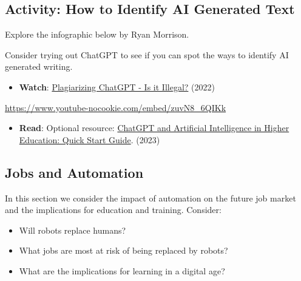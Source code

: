 \documentclass[
  letterpaper,
  DIV=11,
  numbers=noendperiod]{scrreprt}
\providecommand{\tightlist}{%
  \setlength{\itemsep}{0pt}\setlength{\parskip}{0pt}}\usepackage{longtable,booktabs,array}
\begin{document}
\subsection{Activity: How to Identify AI Generated
Text}\label{activity-how-to-identify-ai-generated-text}

\begin{tcolorbox}[enhanced jigsaw, toprule=.15mm, colback=white, colframe=quarto-callout-note-color-frame, bottomtitle=1mm, leftrule=.75mm, coltitle=black, titlerule=0mm, rightrule=.15mm, colbacktitle=quarto-callout-note-color!10!white, left=2mm, title={Learning Activity}, opacitybacktitle=0.6, opacityback=0, breakable, toptitle=1mm, arc=.35mm, bottomrule=.15mm]

Explore the infographic below by Ryan Morrison.

Consider trying out ChatGPT to see if you can spot the ways to identify
AI generated writing.

\begin{itemize}
\tightlist
\item
  \textbf{Watch}:
  \href{https://www.youtube.com/watch?v=zuvN8_6QIKk}{Plagiarizing
  ChatGPT - Is it Illegal?} (2022)
\end{itemize}

\url{https://www.youtube-nocookie.com/embed/zuvN8_6QIKk}

\begin{itemize}
\tightlist
\item
  \textbf{Read}: Optional resource:
  \href{https://www.iesalc.unesco.org/wp-content/uploads/2023/04/ChatGPT-and-Artificial-Intelligence-in-higher-education-Quick-Start-guide_EN_FINAL.pdf}{ChatGPT
  and Artificial Intelligence in Higher Education: Quick Start Guide}.
  (2023)
\end{itemize}

\end{tcolorbox}

\subsection*{Jobs and Automation}\label{jobs-and-automation}

In this section we consider the impact of automation on the future job
market and the implications for education and training. Consider:

\begin{itemize}
\tightlist
\item
  Will robots replace humans?
\item
  What jobs are most at risk of being replaced by robots?
\item
  What are the implications for learning in a digital age?
\end{itemize}
\end{document}

